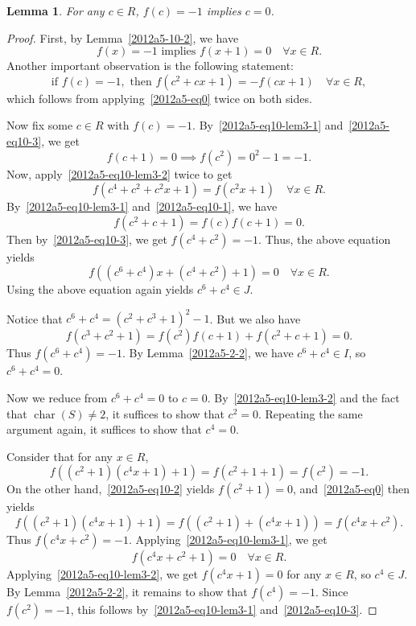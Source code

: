 \documentclass{article}
\DeclareMathOperator{\rchar}{char}
\newtheorem{lemma}{Lemma}
\begin{document}
\begin{lemma}\label{2012a5-10-3}
For any $c \in R$, $f(c) = -1$ implies $c = 0$.
\end{lemma}
\begin{proof}
First, by Lemma~\ref{2012a5-10-2}, we have
\[ f(x) = -1 \text{ implies } f(x + 1) = 0 \quad \forall x \in R. \tag{10.L3.1}\label{2012a5-eq10-lem3-1} \]
Another important observation is the following statement:
\[ \text{if } f(c) = -1, \text{ then } f(c^2 + cx + 1) = -f(cx + 1) \quad \forall x \in R, \tag{10.L3.2}\label{2012a5-eq10-lem3-2} \]
    which follows from applying~\eqref{2012a5-eq0} twice on both sides.

Now fix some $c \in R$ with $f(c) = -1$.
By~\eqref{2012a5-eq10-lem3-1} and~\eqref{2012a5-eq10-3}, we get
\[ f(c + 1) = 0 \implies f(c^2) = 0^2 - 1 = -1. \]
Now, apply~\eqref{2012a5-eq10-lem3-2} twice to get
\[ f(c^4 + c^2 + c^2 x + 1) = f(c^2 x + 1) \quad \forall x \in R. \]
By~\eqref{2012a5-eq10-lem3-1} and~\eqref{2012a5-eq10-1}, we have
\[ f(c^2 + c + 1) = f(c) f(c + 1) = 0. \]
Then by~\eqref{2012a5-eq10-3}, we get $f(c^4 + c^2) = -1$.
Thus, the above equation yields
\[ f((c^6 + c^4) x + (c^4 + c^2) + 1) = 0 \quad \forall x \in R. \]
Using the above equation again yields $c^6 + c^4 \in J$.

Notice that $c^6 + c^4 = (c^2 + c^3 + 1)^2 - 1$.
But we also have
\[ f(c^3 + c^2 + 1) = f(c^2) f(c + 1) + f(c^2 + c + 1) = 0. \]
Thus $f(c^6 + c^4) = -1$.
By Lemma~\ref{2012a5-2-2}, we have $c^6 + c^4 \in I$, so $c^6 + c^4 = 0$.

Now we reduce from $c^6 + c^4 = 0$ to $c = 0$.
By~\eqref{2012a5-eq10-lem3-2} and the fact that $\rchar(S) \neq 2$, it suffices to show that $c^2 = 0$.
Repeating the same argument again, it suffices to show that $c^4 = 0$.

Consider that for any $x \in R$,
\[ f((c^2 + 1)(c^4 x + 1) + 1) = f(c^2 + 1 + 1) = f(c^2) = -1. \]
On the other hand,~\eqref{2012a5-eq10-2} yields $f(c^2 + 1) = 0$, and~\eqref{2012a5-eq0} then yields
\[ f((c^2 + 1)(c^4 x + 1) + 1) = f((c^2 + 1) + (c^4 x + 1)) = f(c^4 x + c^2). \]
Thus $f(c^4 x + c^2) = -1$.
Applying~\eqref{2012a5-eq10-lem3-1}, we get
\[ f(c^4 x + c^2 + 1) = 0 \quad \forall x \in R. \]
Applying~\eqref{2012a5-eq10-lem3-2}, we get $f(c^4 x + 1) = 0$ for any $x \in R$, so $c^4 \in J$.
By Lemma~\ref{2012a5-2-2}, it remains to show that $f(c^4) = -1$.
Since $f(c^2) = -1$, this follows by~\eqref{2012a5-eq10-lem3-1} and~\eqref{2012a5-eq10-3}.
\end{proof}
\end{document}

